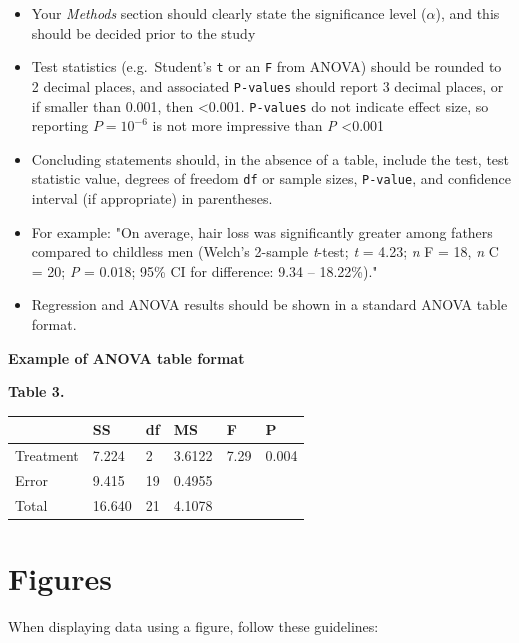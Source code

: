\documentclass[
]{book}
\begin{document}
\begin{itemize}
\item
  Your \emph{Methods} section should clearly state the significance level (\(\alpha\)), and this should be decided prior to the study
\item
  Test statistics (e.g.~Student's \texttt{t} or an \texttt{F} from ANOVA) should be rounded to 2 decimal places, and associated \texttt{P-values} should report 3 decimal places, or if smaller than 0.001, then \textless0.001. \texttt{P-values} do not indicate effect size, so reporting \(P = 10^{-6}\) is not more impressive than \emph{P} \textless0.001
\item
  Concluding statements should, in the absence of a table, include the test, test statistic value, degrees of freedom \texttt{df} or sample sizes, \texttt{P-value}, and confidence interval (if appropriate) in parentheses.
\item
  For example: "On average, hair loss was significantly greater among fathers compared to childless men (Welch's 2-sample \emph{t}-test; \emph{t} = 4.23; \emph{n} F = 18, \emph{n} C = 20; \emph{P} = 0.018; 95\% CI for difference: 9.34 -- 18.22\%)."\\
\item
  Regression and ANOVA results should be shown in a standard ANOVA table format.
\end{itemize}

\textbf{Example of ANOVA table format}

\textbf{Table 3.}

\begin{longtable}[]{@{}llllll@{}}
\toprule
& SS & df & MS & F & P \\
\midrule
\endhead
Treatment & 7.224 & 2 & 3.6122 & 7.29 & 0.004 \\
Error & 9.415 & 19 & 0.4955 & & \\
Total & 16.640 & 21 & 4.1078 & & \\
\bottomrule
\end{longtable}

\hypertarget{figures}{%
\section{Figures}\label{figures}}

When displaying data using a figure, follow these guidelines:
\end{document}
